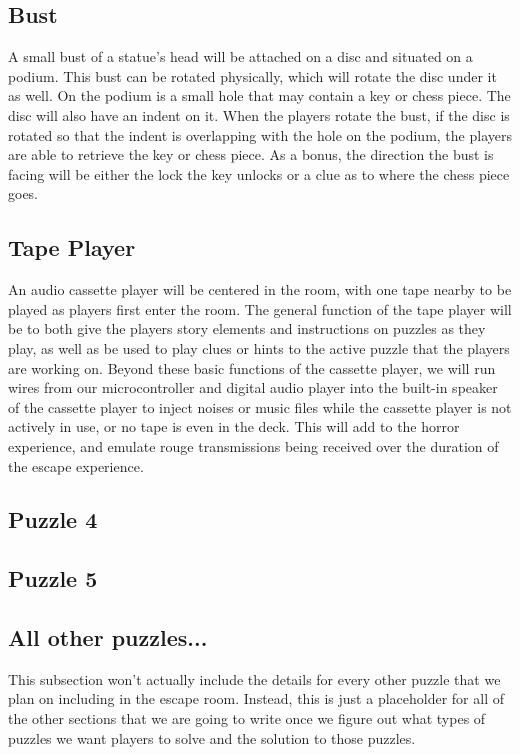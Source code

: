 \documentclass[conference]{IEEEtran}
\begin{document}
\subsection{Bust}
A small bust of a statue's head will be attached on a disc and situated
on a podium. This bust can be rotated physically, which will rotate the
disc under it as well. On the podium is a small hole that may contain a key
or chess piece. The disc will also have an indent on it. When the players
rotate the bust, if the disc is rotated so that the indent is overlapping
with the hole on the podium, the players are able to retrieve the key
or chess piece. As a bonus, the direction the bust is facing will be either
the lock the key unlocks or a clue as to where the chess piece goes.

\subsection{Tape Player}
An audio cassette player will be centered in the room, with one tape nearby
to be played as players first enter the room. The general function of the tape
player will be to both give the players story elements and instructions on
puzzles as they play, as well as be used to play clues or hints to the active
puzzle that the players are working on. Beyond these basic functions of the
cassette player, we will run wires from our microcontroller and digital audio
player into the built-in speaker of the cassette player to inject noises or music
files while the cassette player is not actively in use, or no tape is even in the
deck. This will add to the horror experience, and emulate rouge transmissions
being received over the duration of the escape experience.

\subsection{Puzzle 4}

\subsection{Puzzle 5}

\subsection{All other puzzles...}
This subsection won't actually include the details for every other puzzle that we plan on including
in the escape room. Instead, this is just a placeholder for all of the other sections that we are
going to write once we figure out what types of puzzles we want players to solve and the solution
to those puzzles.
\end{document}
